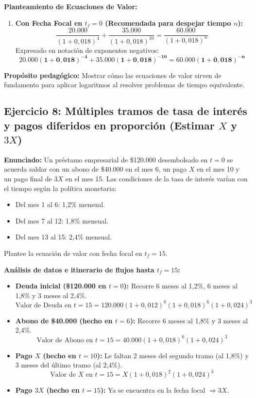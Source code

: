 \documentclass[11pt, a4paper]{article}
\begin{document}
\textbf{Planteamiento de Ecuaciones de Valor:}
\begin{enumerate}[label=\alph*)]
    \item \textbf{Con Fecha Focal en $t_f = 0$ (Recomendada para despejar tiempo $n$):}
    \[
    \frac{20.000}{(1 + 0,018)^4} + \frac{35.000}{(1 + 0,018)^{10}} = \frac{60.000}{(1 + 0,018)^n}
    \]
    Expresado en notación de exponentes negativos:
    \[
    \mathbf{20.000(1 + 0,018)^{-4} + 35.000(1 + 0,018)^{-10} = 60.000(1 + 0,018)^{-n}}
    \]
\end{enumerate}

\textbf{Propósito pedagógico:} Mostrar cómo las ecuaciones de valor sirven de fundamento para aplicar logaritmos al resolver problemas de tiempo equivalente.

\vspace{0.2cm}

\subsection*{\color{secondary} Ejercicio 8: Múltiples tramos de tasa de interés y pagos diferidos en proporción (Estimar $X$ y $3X$)}
\textbf{Enunciado:} Un préstamo empresarial de \$120.000 desembolsado en $t=0$ se acuerda saldar con un abono de \$40.000 en el mes 6, un pago $X$ en el mes 10 y un pago final de $3X$ en el mes 15. Las condiciones de la tasa de interés varían con el tiempo según la política monetaria:
\begin{itemize}
    \item Del mes 1 al 6: 1,2\% mensual.
    \item Del mes 7 al 12: 1,8\% mensual.
    \item Del mes 13 al 15: 2,4\% mensual.
\end{itemize}
Plantee la ecuación de valor con fecha focal en $t_f = 15$.

\textbf{Análisis de datos e itinerario de flujos hasta $t_f = 15$:}
\begin{itemize}
    \item \textbf{Deuda inicial (\$120.000 en $t=0$):} Recorre 6 meses al 1,2\%, 6 meses al 1,8\% y 3 meses al 2,4\%.
    \[
    \text{Valor de Deuda en } t=15 = 120.000(1 + 0,012)^6 (1 + 0,018)^6 (1 + 0,024)^3
    \]
    \item \textbf{Abono de \$40.000 (hecho en $t=6$):} Recorre 6 meses al 1,8\% y 3 meses al 2,4\%.
    \[
    \text{Valor de Abono en } t=15 = 40.000(1 + 0,018)^6 (1 + 0,024)^3
    \]
    \item \textbf{Pago $X$ (hecho en $t=10$):} Le faltan 2 meses del segundo tramo (al 1,8\%) y 3 meses del último tramo (al 2,4\%).
    \[
    \text{Valor de $X$ en } t=15 = X(1 + 0,018)^2 (1 + 0,024)^3
    \]
    \item \textbf{Pago $3X$ (hecho en $t=15$):} Ya se encuentra en la fecha focal $\Rightarrow 3X$.
\end{itemize}
\end{document}
